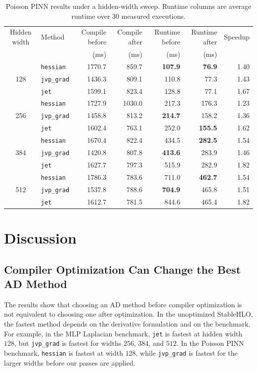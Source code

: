 \documentclass{article}
\theoremstyle{plain}
\theoremstyle{definition}
\theoremstyle{remark}
\begin{document}
\begin{table}[t]
\centering
\caption{Poisson PINN results under a hidden-width sweep.  Runtime columns are
average runtime over 30 measured executions.}
\label{tab:pinn-results}
\begin{tabular}{clrrrrr}
\toprule
Hidden width & Method & Compile before & Compile after & Runtime before
& Runtime after & Speedup \\
 & & (ms) & (ms) & (ms) & (ms) & \\
\midrule
\multirow{3}{*}{128}
& \texttt{hessian} & 1770.7 & 859.7 & \textbf{107.9} & \textbf{76.9} & 1.40 \\
& \texttt{jvp\_grad} & 1436.3 & 809.1 & 110.8 & 77.3 & 1.43 \\
& \texttt{jet} & 1599.1 & 823.4 & 128.8 & 77.1 & 1.67 \\
\midrule
\multirow{3}{*}{256}
& \texttt{hessian} & 1727.9 & 1030.0 & 217.3 & 176.3 & 1.23 \\
& \texttt{jvp\_grad} & 1458.8 & 813.2 & \textbf{214.7} & 158.2 & 1.36 \\
& \texttt{jet} & 1602.4 & 763.1 & 252.0 & \textbf{155.5} & 1.62 \\
\midrule
\multirow{3}{*}{384}
& \texttt{hessian} & 1670.4 & 822.4 & 434.5 & \textbf{282.5} & 1.54 \\
& \texttt{jvp\_grad} & 1420.8 & 807.8 & \textbf{413.6} & 283.9 & 1.46 \\
& \texttt{jet} & 1627.7 & 797.3 & 515.9 & 282.9 & 1.82 \\
\midrule
\multirow{3}{*}{512}
& \texttt{hessian} & 1786.3 & 783.6 & 711.0 & \textbf{462.7} & 1.54 \\
& \texttt{jvp\_grad} & 1537.8 & 788.6 & \textbf{704.9} & 465.8 & 1.51 \\
& \texttt{jet} & 1612.7 & 781.5 & 844.6 & 465.4 & 1.82 \\
\bottomrule
\end{tabular}
\end{table}

\section{Discussion}

\subsection{Compiler Optimization Can Change the Best AD Method}
The results show that choosing an AD method before compiler optimization is not
equivalent to choosing one after optimization.  In the unoptimized StableHLO,
the fastest method depends on the derivative formulation and on the benchmark.
For example, in the MLP Laplacian benchmark, \texttt{jet} is fastest at hidden
width \(128\), but \texttt{jvp\_grad} is fastest for widths \(256\), \(384\),
and \(512\).  In the Poisson PINN benchmark, \texttt{hessian} is fastest at
width \(128\), while \texttt{jvp\_grad} is fastest for the larger widths before
our passes are applied. 
\end{document}
